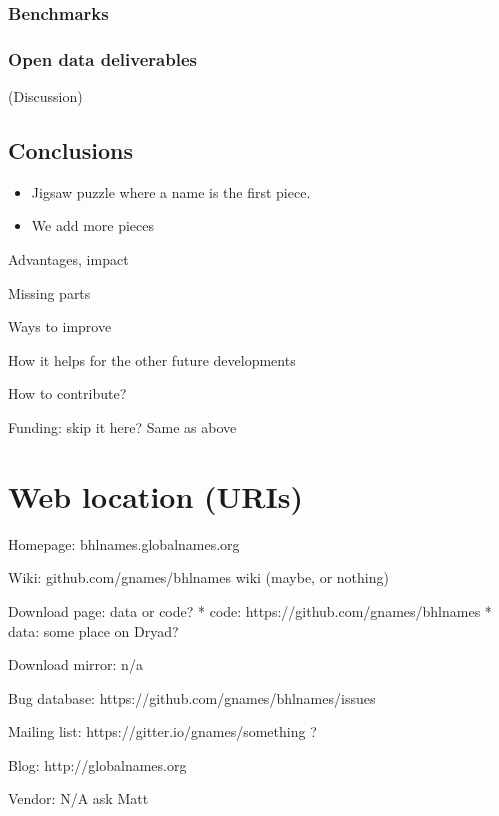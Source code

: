 \documentclass[
]{article}
\providecommand{\tightlist}{%
  \setlength{\itemsep}{0pt}\setlength{\parskip}{0pt}}
\begin{document}
\hypertarget{benchmarks}{%
\subsubsection{Benchmarks}\label{benchmarks}}

\hypertarget{open-data-deliverables}{%
\subsubsection{Open data deliverables}\label{open-data-deliverables}}

(Discussion)

\hypertarget{conclusions}{%
\subsection{Conclusions}\label{conclusions}}

\begin{itemize}
\tightlist
\item
  Jigsaw puzzle where a name is the first piece.
\item
  We add more pieces
\end{itemize}

Advantages, impact

Missing parts

Ways to improve

How it helps for the other future developments

How to contribute?

Funding: skip it here? Same as above

\hypertarget{web-location-uris}{%
\section{Web location (URIs)}\label{web-location-uris}}

Homepage: bhlnames.globalnames.org

Wiki: github.com/gnames/bhlnames wiki (maybe, or nothing)

Download page: data or code? * code: https://github.com/gnames/bhlnames
* data: some place on Dryad?

Download mirror: n/a

Bug database: https://github.com/gnames/bhlnames/issues

Mailing list: https://gitter.io/gnames/something ?

Blog: http://globalnames.org

Vendor: N/A ask Matt
\end{document}
